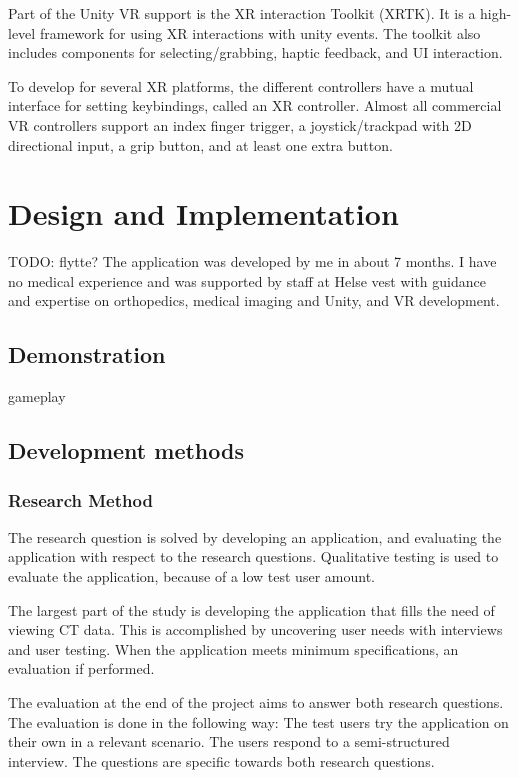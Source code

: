 \documentclass[a4paper]{report}
\begin{document}
Part of the Unity VR support is the XR interaction Toolkit (XRTK)\cite{xrinteractiontoolkit}. It is a high-level framework for using XR interactions with unity events. The toolkit also includes components for selecting/grabbing, haptic feedback, and UI interaction.

To develop for several XR platforms, the different controllers have a mutual interface for setting keybindings, called an XR controller. Almost all commercial VR controllers support an index finger trigger, a joystick/trackpad with 2D directional input, a grip button, and at least one extra button\cite{technologies_unity_nodate}.



\chapter{Design and Implementation}\label{Design and Implementation}
TODO: flytte?
The application was developed by me in about 7 months. I have no medical experience and was supported by staff at Helse vest with guidance and expertise on orthopedics, medical imaging and Unity, and VR development.

\section{Demonstration}\label{demonstration}
gameplay

\section{Development methods}

\subsection{Research Method}
The research question is solved by developing an application, and evaluating the application with respect to the research questions. Qualitative testing is used to evaluate the application, because of a low test user amount.

The largest part of the study is developing the application that fills the need of viewing CT data. This is accomplished by uncovering user needs with interviews and user testing. When the application meets minimum specifications, an evaluation if performed. 

The evaluation at the end of the project aims to answer both research questions. The evaluation is done in the following way:
The test users try the application on their own in a relevant scenario.
The users respond to a semi-structured interview. The questions are specific towards both research questions.
\end{document}
